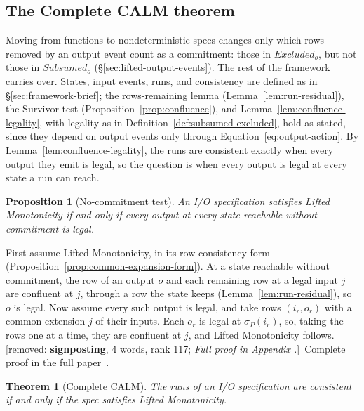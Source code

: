 \documentclass[sigconf]{cidr-2027}
\makeatletter
\newtheorem{theorem}{Theorem}
\newtheorem{proposition}{Proposition}
\theoremstyle{remark}
\newcommand{\commitment}{commitment\xspace}
\newcommand{\spectype}[1][]{I/O specification#1\xspace}
\newcommand{\Subsumed}{\mathit{Subsumed}}
\newcommand{\Excluded}{\mathit{Excluded}}
\newcommand{\fullproof}{Complete proof in the full paper~\cite{hellerstein2026completecalmfull}.}
\renewenvironment{proof}[1][\proofname]{\par
  \pushQED{\qed}\normalfont\topsep2\p@\relax
  \trivlist\item[\@proofindent\hskip\labelsep{\@proofnamefont #1\@addpunct{.}}]\ignorespaces
}{\popQED\endtrivlist\@endpefalse}
\newcommand{\removednote}[1]{{\color{cutred}\footnotesize\,[removed: #1]\,}}
\makeatother
\begin{document}
\subsection{The Complete CALM theorem}
\label{sec:complete-calm-theorem}

\textcolor{newblue}{Moving from functions to nondeterministic specs changes only which rows
removed by an output event count as a \commitment: those in $\Excluded_o$, but
not those in $\Subsumed_o$ (\S\ref{sec:lifted-output-events}).} \textcolor{newblue}{The rest of the
framework carries over.} \textcolor{newblue}{States, input events, runs, and consistency are defined as in \S\ref{sec:framework-brief}; the
rows-remaining lemma (Lemma~\ref{lem:run-residual}), the Survivor test
(Proposition~\ref{prop:confluence}), and Lemma~\ref{lem:confluence-legality},
with legality as in Definition~\ref{def:subsumed-excluded}, hold as stated, since
they depend on output events only through Equation~\ref{eq:output-action}.} \textcolor{newblue}{By Lemma~\ref{lem:confluence-legality}, the runs are consistent exactly when
every output they emit is legal, so the question is when every output is legal
at every state a run can reach.}

\begin{proposition}[No-\commitment test]
\label{prop:exposure-boundary}
An \spectype satisfies Lifted Monotonicity if and only
if every output at every state reachable without \commitment is legal.
\end{proposition}

\begin{proof}[Proof sketch]
First assume Lifted Monotonicity, in its row-consistency form
(Proposition~\ref{prop:common-expansion-form}). At a state reachable without
\commitment, the row of an output $o$ and each remaining row at a legal input $j$ are confluent at $j$, through a row the state keeps
(Lemma~\ref{lem:run-residual}), so $o$ is legal. Now assume every such output
is legal, and take rows $(i_r,o_r)$ with a common extension $j$ of their inputs. Each $o_r$ is
legal at $\sigma_P(i_r)$, so, taking the rows one at a time, they are
confluent at $j$, and Lifted Monotonicity follows. \removednote{\textbf{signposting}, 4 words, rank 117; \textit{Full proof in Appendix .}} \textcolor{newblue}{\fullproof}
\end{proof}

\begin{theorem}[Complete CALM]
\label{thm:complete-calm}
The runs of an \spectype are consistent if and only if the spec satisfies
Lifted Monotonicity.
\end{theorem}
\end{document}
